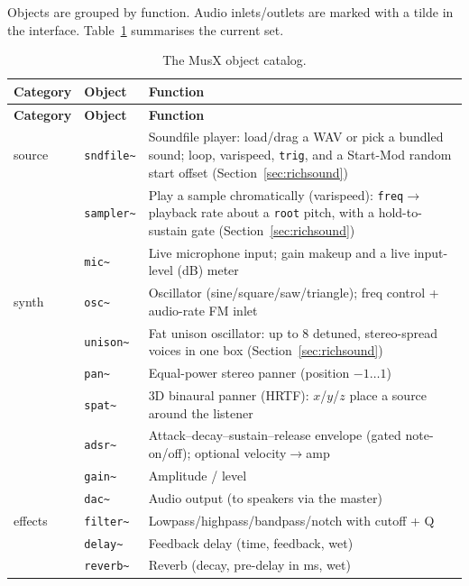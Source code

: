 \documentclass[11pt,letterpaper]{article}
\begin{document}
Objects are grouped by function. Audio inlets/outlets are marked with a tilde in
the interface. Table~\ref{tab:objects} summarises the current set.

{\small
\begin{longtable}{@{}llp{7.4cm}@{}}
\caption{The MusX object catalog.}\label{tab:objects}\\
\toprule
\textbf{Category} & \textbf{Object} & \textbf{Function} \\
\midrule
\endfirsthead
\toprule
\textbf{Category} & \textbf{Object} & \textbf{Function} \\
\midrule
\endhead
source   & \texttt{sndfile\~{}} & Soundfile player: load/drag a WAV or pick a bundled sound; loop, varispeed, \texttt{trig}, and a Start-Mod random start offset (Section~\ref{sec:richsound}) \\
         & \texttt{sampler\~{}} & Play a sample chromatically (varispeed): \texttt{freq}$\rightarrow$playback rate about a \texttt{root} pitch, with a hold-to-sustain gate (Section~\ref{sec:richsound}) \\
         & \texttt{mic\~{}}     & Live microphone input; gain makeup and a live input-level (dB) meter \\
\midrule
synth    & \texttt{osc\~{}}   & Oscillator (sine/square/saw/triangle); freq control + audio-rate FM inlet \\
         & \texttt{unison\~{}} & Fat unison oscillator: up to 8 detuned, stereo-spread voices in one box (Section~\ref{sec:richsound}) \\
         & \texttt{pan\~{}}   & Equal-power stereo panner (position $-1\ldots1$) \\
         & \texttt{spat\~{}}  & 3D binaural panner (HRTF): $x$/$y$/$z$ place a source around the listener \\
         & \texttt{adsr\~{}}  & Attack--decay--sustain--release envelope (gated note-on/off); optional velocity$\rightarrow$amp \\
         & \texttt{gain\~{}}  & Amplitude / level \\
         & \texttt{dac\~{}}   & Audio output (to speakers via the master) \\
\midrule
effects  & \texttt{filter\~{}} & Lowpass/highpass/bandpass/notch with cutoff + Q \\
         & \texttt{delay\~{}}  & Feedback delay (time, feedback, wet) \\
         & \texttt{reverb\~{}} & Reverb (decay, pre-delay in ms, wet) \\

\end{longtable}}
\end{document}
